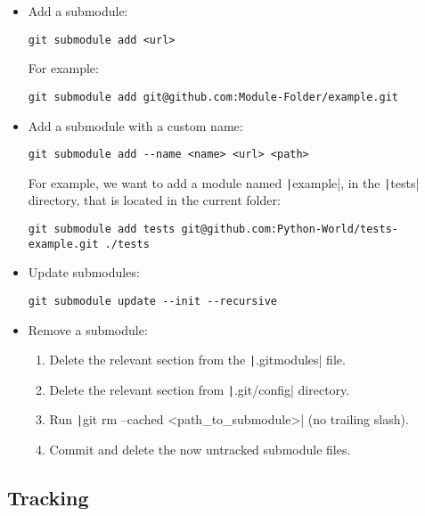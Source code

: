\begin{itemize}
    \item Add a submodule:
    \begin{verbatim}
git submodule add <url>
    \end{verbatim}
    For example:
    \begin{verbatim}
git submodule add git@github.com:Module-Folder/example.git
    \end{verbatim}
    \item Add a submodule with a custom name:
    \begin{verbatim}
git submodule add --name <name> <url> <path>
    \end{verbatim}
    For example, we want to add a module named \texttt|example|, in the
    \texttt|tests| directory, that is located in the current folder:
    \begin{verbatim}
git submodule add tests git@github.com:Python-World/tests-example.git ./tests
    \end{verbatim}
    \item Update submodules:
    \begin{verbatim}
git submodule update --init --recursive
    \end{verbatim}
    \item Remove a submodule:
    \begin{enumerate}
        \item Delete the relevant section from the \texttt|.gitmodules| file.
        \item Delete the relevant section from \texttt|.git/config| directory.
        \item Run \texttt|git rm --cached <path_to_submodule>| (no trailing slash).
        \item Commit and delete the now untracked submodule files.
    \end{enumerate}
\end{itemize}


\subsection{Tracking}

